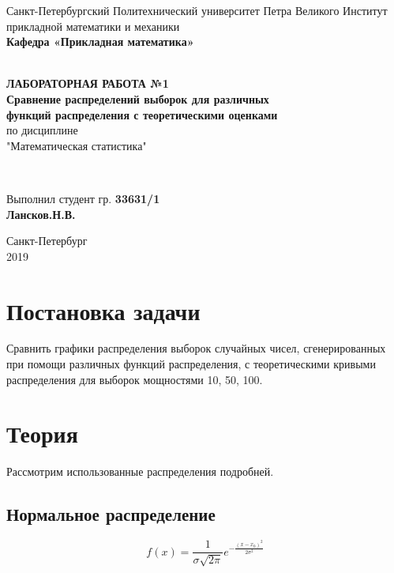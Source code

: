 \documentclass[12pt]{article}
\begin{document}
\begin{titlepage}
	\center
		Санкт-Петербургский Политехнический 
		университет Петра Великого
		Институт прикладной математики и механики
		\\ \textbf{Кафедра «Прикладная математика»}

	\vfill ~
	\textbf{
		\\ \large ЛАБОРАТОРНАЯ РАБОТА №1
		\\	\normalsize	
			Сравнение распределений выборок для различных 
		\\	функций распределения с теоретическими оценками
	}
	\\	по дисциплине 
	\\	"Математическая статистика"

	\vfill ~

	Выполнил студент гр. \textbf{33631/1} \\
	\textbf{Лансков.Н.В.} \\ 

\vfill

{\large}	Санкт-Петербург
\\ 2019
\end{titlepage}

\tableofcontents
\pagebreak


\section{Постановка задачи}
Сравнить графики распределения выборок случайных чисел, сгенерированных при помощи различных функций распределения, с теоретическими кривыми распределения для выборок мощностями 10, 50, 100.

\section{Теория}
Рассмотрим использованные распределения подробней.

\subsection{Нормальное распределение}

\begin{equation} \label{eq1}
f(x)= \frac{1}{\sigma\sqrt{2\pi}}e^{-\frac{(x - x_0)^2}{2\sigma^2}}
\end{equation}
\end{document}
